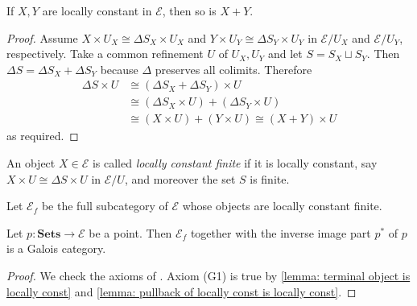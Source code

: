 \begin{lemma}
\label{lemma: locally constant coproducts}
If $X,Y$ are locally constant in $\mathscr{E}$, then so is $X + Y$.
\end{lemma}
\begin{proof}
Assume $X \times U_X \cong \Delta S_X \times U_X$ and $Y \times U_Y \cong \Delta S_Y \times U_Y$ in $\mathscr{E}/U_X$ and $\mathscr{E}/U_Y$, respectively. Take a common refinement $U$ of $U_X,U_Y$ and let $S = S_X \sqcup S_Y$. Then $\Delta S = \Delta S_X + \Delta S_Y$ because $\Delta$ preserves all colimits. Therefore
\begin{align*}
\Delta S \times U &\cong \left( \Delta S_X + \Delta S_Y \right) \times U \\
&\cong \left( \Delta S_X \times U \right) + \left( \Delta S_Y \times U \right) \\
&\cong \left(X \times U \right) + \left(Y \times U \right) \cong \left(X + Y\right) \times U
\end{align*}
as required.
\end{proof}

\begin{definition}
An object $X \in \mathscr{E}$ is called \emph{locally constant finite} if it is locally constant, say $X \times U \cong \Delta S \times U$ in $\mathscr{E}/U$, and moreover the set $S$ is finite.
\end{definition}

Let $\mathscr{E}_f$ be the full subcategory of $\mathscr{E}$ whose objects are locally constant finite.

\begin{proposition}
Let $p : \mathbf{Sets} \to \mathscr{E}$ be a point. Then $\mathscr{E}_f$ together with the inverse image part $p^*$ of $p$ is a Galois category.
\end{proposition}
\begin{proof}
We check the axioms of \cite[Definition 3.1]{lenstra08}. Axiom (G1) is true by \cref{lemma: terminal object is locally const} and \cref{lemma: pullback of locally const is locally const}.
\end{proof}
